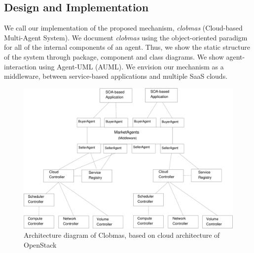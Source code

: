 \documentclass[10pt,journal,compsoc]{IEEEtran}
\begin{document}
\subsection{Design and Implementation}
We call our implementation of the proposed mechanism, \textit{clobmas} (Cloud-based Multi-Agent System). We document \textit{clobmas} using the object-oriented paradigm for all of the internal components of an agent. Thus, we show the static structure of the system through package, component and class diagrams. We show agent-interaction using Agent-UML (AUML). We envision our mechanism as a middleware, between service-based applications and multiple SaaS clouds.
\begin{figure}[htbp]
    \centering
    \includegraphics[scale=0.5]{drawings/Overall_Structure.pdf}
    \caption{Architecture diagram of Clobmas, based on cloud architecture of OpenStack \label{fig:architectural_context}}
\end{figure}

%
\end{document}
